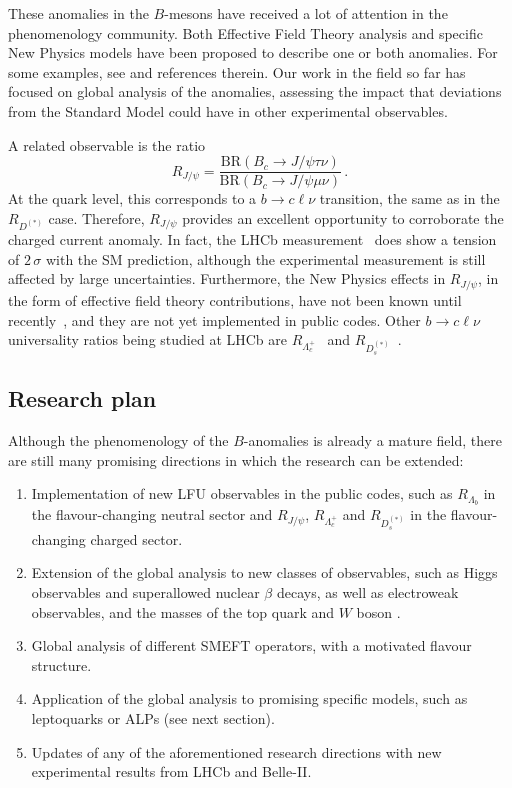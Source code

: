\documentclass[combined.tex]{subfiles}
\begin{document}
These anomalies in the $B$-mesons have received a lot of attention in the phenomenology community. Both Effective Field Theory analysis and specific New Physics models have been proposed to describe one or both anomalies. For some examples, see \cite{Alda:2018mfy,Alda:2020okk,Alda:2021ruz,Alda:2021rgt,Alda:2021krg} and references therein. Our work in the field so far has focused on global analysis of the anomalies, assessing the impact that deviations from the Standard Model could have in other experimental observables.

A related observable is the ratio
\begin{equation}
  R_{J/\psi} = \frac{\mathrm{BR}(B_c\to J/\psi \tau \nu)}{\mathrm{BR}(B_c\to J/\psi \mu \nu)}\,.
\end{equation}
At the quark level, this corresponds to a $b\to c\ell\nu$ transition, the same as in the $R_{D^{(*)}}$ case. Therefore, $R_{J/\psi}$ provides an excellent opportunity to corroborate the charged current anomaly. In fact, the LHCb measurement~\cite{LHCb:2017vlu} does show a tension of $2\,\sigma$ with the SM prediction, although the experimental measurement is still affected by large uncertainties. Furthermore, the New Physics effects in $R_{J/\psi}$, in the form of effective field theory contributions, have not been known until recently~\cite{Harrison:2020gvo,Tang:2022nqm}, and they are not yet implemented in public codes. Other $b\to c\ell\nu$ universality ratios being studied at LHCb are $R_{\Lambda_c^+}$~\cite{LHCb:2022piu} and $R_{D_s^{(*)}}$~\cite{Puthumanaillam:2023,Penalva:2023snz}.


\subsection{Research plan}
Although the phenomenology of the $B$-anomalies is already a mature field, there are still many promising directions in which the research can be extended:
\begin{enumerate}
\item Implementation of new LFU observables in the public codes, such as $R_{\Lambda_b}$ in the flavour-changing neutral sector and $R_{J/\psi}$, $R_{\Lambda_c^+}$ and $R_{D_s^{(*)}}$ in the flavour-changing charged sector.
\item Extension of the global analysis to new classes of observables, such as Higgs observables and superallowed nuclear $\beta$ decays, as well as electroweak observables, and the masses of the top quark and $W$ boson \cite{deBlas:2021wap,deBlas:2022hdk}.
\item Global analysis of different SMEFT operators, with a motivated flavour structure.
\item Application of the global analysis to promising specific models, such as leptoquarks or ALPs (see next section). 
\item Updates of any of the aforementioned research directions with new experimental results from LHCb and Belle-II.
\end{enumerate}
\end{document}
